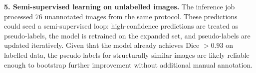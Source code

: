 \documentclass[11pt,letterpaper]{article}
\begin{document}
\textbf{5. Semi-supervised learning on unlabelled images.}
The inference job processed 76 unannotated images from the same protocol. These predictions could seed a semi-supervised loop: high-confidence predictions are treated as pseudo-labels, the model is retrained on the expanded set, and pseudo-labels are updated iteratively. Given that the model already achieves Dice $>0.93$ on labelled data, the pseudo-labels for structurally similar images are likely reliable enough to bootstrap further improvement without additional manual annotation.
\end{document}
